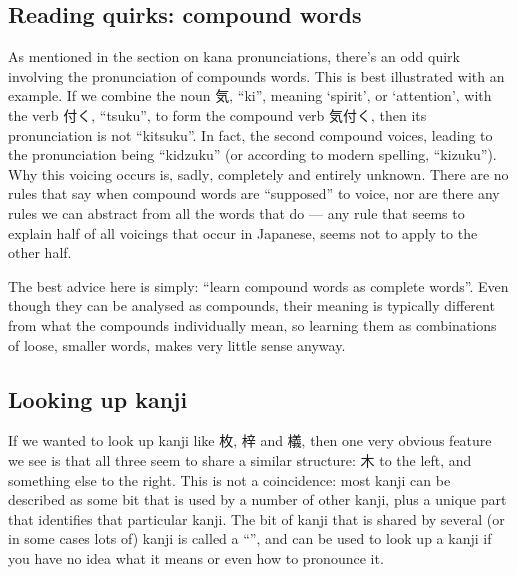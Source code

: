 \documentclass[11pt, b5paper, twoside, openright, onecolumn]{book}
\begin{document}
\subsection{Reading quirks: compound words}

As mentioned in the section on kana pronunciations‚ there’s an odd quirk involving the pronunciation of compounds words. This is best illustrated with an example. If we combine the noun 気‚ “ki”‚ meaning ‘spirit’‚ or ‘attention’‚ with the verb 付く‚ “tsuku”‚ to form the compound verb 気付く‚ then its pronunciation is not “kitsuku”. In fact‚ the second compound voices‚ leading to the pronunciation being “kidzuku” (or according to modern spelling‚ “kizuku”). Why this voicing occurs is‚ sadly‚ completely and entirely unknown. There are no rules that say when compound words are “supposed” to voice‚ nor are there any rules we can abstract from all the words that do — any rule that seems to explain half of all voicings that occur in Japanese‚ seems not to apply to the other half.

The best advice here is simply: “learn compound words as complete words”. Even though they can be analysed as compounds‚ their meaning is typically different from what the compounds individually mean‚ so learning them as combinations of loose‚ smaller words‚ makes very little sense anyway.

\subsection{Looking up kanji}

If we wanted to look up kanji like 枚‚ 梓 and 檥‚ then one very obvious feature we see is that all three seem to share a similar structure: 木 to the left‚ and something else to the right. This is not a coincidence: most kanji can be described as some bit that is used by a number of other kanji‚ plus a unique part that identifies that particular kanji. The bit of kanji that is shared by several (or in some cases lots of) kanji is called a “”‚ and can be used to look up a kanji if you have no idea what it means or even how to pronounce it.
\end{document}

